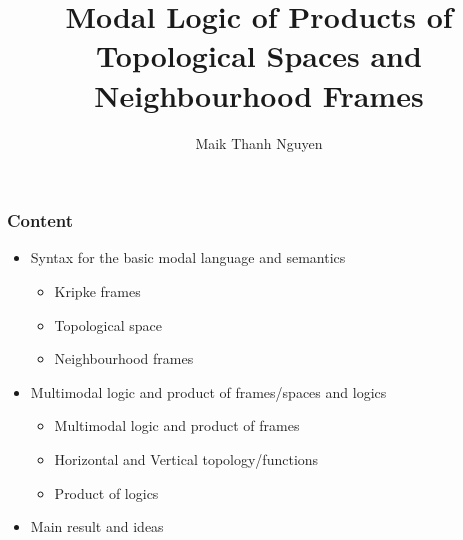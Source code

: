 \documentclass[hyperref={pdfpagelabels=false},t,10pt]{beamer}
\title{Modal Logic of Products of Topological Spaces and Neighbourhood Frames}
\author[© author]{Maik Thanh Nguyen}
\institute{Technische Universit\"at Dresden}
\begin{document}
\addtocounter{framenumber}{-1}
\maketitle

\begin{frame}
  \frametitle{Content}

  \begin{itemize}
  \item Syntax for the basic modal language and semantics
    \begin{itemize}
        \item Kripke frames
        \item Topological space
        \item Neighbourhood frames
     \end{itemize}
  \item Multimodal logic and product of frames/spaces and logics
    \begin{itemize}
      \item Multimodal logic and product of frames
      \item Horizontal and Vertical topology/functions
      \item Product of logics
    \end{itemize}
  \item Main result and ideas
  \end{itemize}
\end{frame}
\end{document}
